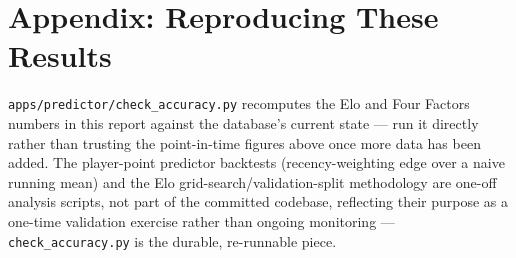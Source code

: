\documentclass[11pt]{article}
\newcommand{\code}[1]{\allowbreak\texttt{\small #1}\allowbreak}
\begin{document}
\section*{Appendix: Reproducing These Results}

\code{apps/predictor/check\_accuracy.py} recomputes the Elo and Four Factors numbers in this report against
the database's current state — run it directly rather than trusting the point-in-time figures above once
more data has been added. The player-point predictor backtests (recency-weighting edge over a naive running
mean) and the Elo grid-search/validation-split methodology are one-off analysis scripts, not part of the
committed codebase, reflecting their purpose as a one-time validation exercise rather than ongoing monitoring
— \code{check\_accuracy.py} is the durable, re-runnable piece.
\end{document}
